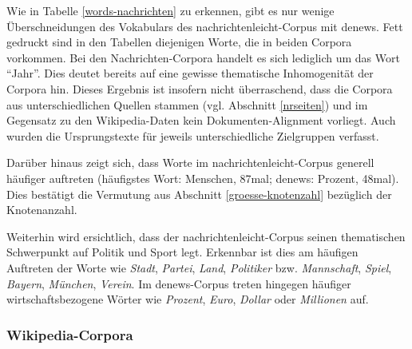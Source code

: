 \documentclass[11pt, a4paper]{article}
\begin{document}
Wie in Tabelle \ref{words-nachrichten} zu erkennen, gibt es nur wenige
Überschneidungen des Vokabulars des nachrichtenleicht-Corpus mit denews.
Fett gedruckt sind in den Tabellen diejenigen Worte, die in beiden Corpora
vorkommen.
Bei den Nachrichten-Corpora handelt es sich lediglich um das Wort "`Jahr"'.
Dies deutet bereits auf eine gewisse thematische Inhomogenität der Corpora hin.
Dieses Ergebnis ist insofern nicht überraschend, dass die Corpora aus
unterschiedlichen Quellen stammen (vgl. Abschnitt \ref{nrseiten}) und
im Gegensatz zu den Wikipedia-Daten kein Dokumenten-Alignment vorliegt.
Auch wurden die Ursprungstexte für jeweils unterschiedliche Zielgruppen verfasst.

Darüber hinaus zeigt sich, dass Worte im nachrichtenleicht-Corpus generell
häufiger auftreten (häufigstes Wort: Menschen, 87mal; denews: Prozent, 48mal).
Dies bestätigt die Vermutung aus Abschnitt \ref{groesse-knotenzahl} bezüglich der
Knotenanzahl.

Weiterhin wird ersichtlich, dass der nachrichtenleicht-Corpus seinen
thematischen Schwerpunkt auf Politik und Sport legt.
Erkennbar ist dies am häufigen Auftreten der Worte wie \emph{Stadt}, \emph{Partei}, \emph{Land},
\emph{Politiker} bzw. \emph{Mannschaft}, \emph{Spiel}, \emph{Bayern}, \emph{München}, \emph{Verein}.
Im denews-Corpus treten hingegen häufiger wirtschaftsbezogene Wörter wie \emph{Prozent},
\emph{Euro}, \emph{Dollar} oder \emph{Millionen} auf.


\subsubsection{Wikipedia-Corpora}
\end{document}
